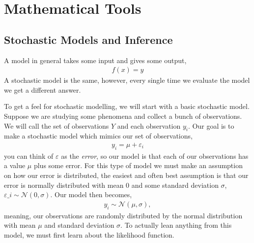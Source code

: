 \chapter{Mathematical Tools}

\section{Stochastic Models and Inference}

A model in general takes some input and gives some output,
\begin{align*}
    f(x) = y
\end{align*}
A stochastic model is the same, however, every single time we evaluate the model we get a different answer. 

To get a feel for stochastic modelling, we will start with a basic stochastic model. Suppose we are studying some phenomena and collect a bunch of observations. We will call the set of observations $Y$ and each observation $y_i$. Our goal is to make a stochastic model which mimics our set of observations,
\begin{align*}
    y_i = \mu + \varepsilon_i
\end{align*}
you can think of $\varepsilon$ as the \textit{error}, so our model is that each of our observations has a value $\mu$ plus some error. For this type of model we must make an assumption on how our error is distributed, the easiest and often best assumption is that our error is normally distributed with mean 0 and some standard deviation $\sigma$, $\varepsilon\_i\sim\mathcal{N}(0,\sigma)$. Our model then becomes,
\begin{align*}
    y_i\sim\mathcal{N}(\mu,\sigma),
\end{align*}
meaning, our observations are randomly distributed by the normal distribution with mean $\mu$ and standard deviation $\sigma$. To actually lean anything from this model, we must first learn about the likelihood function.

